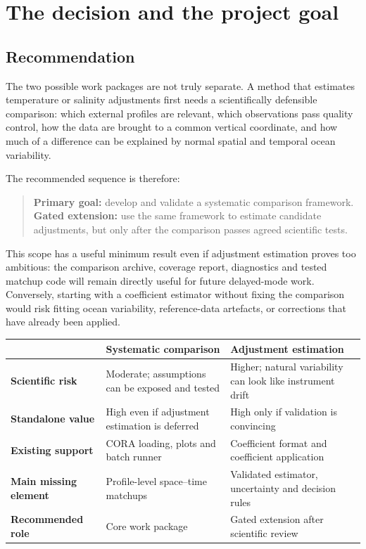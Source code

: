 \documentclass[11pt,a4paper]{article}
\begin{document}
\section{The decision and the project goal}

\subsection{Recommendation}

The two possible work packages are not truly separate. A method that estimates
temperature or salinity adjustments first needs a scientifically defensible comparison:
which external profiles are relevant, which observations pass quality control, how the
data are brought to a common vertical coordinate, and how much of a difference can be
explained by normal spatial and temporal ocean variability.

The recommended sequence is therefore:

\begin{quote}
\textbf{Primary goal:} develop and validate a systematic comparison framework.\\
\textbf{Gated extension:} use the same framework to estimate candidate adjustments,
but only after the comparison passes agreed scientific tests.
\end{quote}

This scope has a useful minimum result even if adjustment estimation proves too
ambitious: the comparison archive, coverage report, diagnostics and tested matchup code
will remain directly useful for future delayed-mode work. Conversely, starting with a
coefficient estimator without fixing the comparison would risk fitting ocean variability,
reference-data artefacts, or corrections that have already been applied.

\begin{center}
\begin{tabularx}{0.96\textwidth}{>{\bfseries}p{}XX}
\toprule
 & Systematic comparison & Adjustment estimation \\
\midrule
Scientific risk & Moderate; assumptions can be exposed and tested & Higher; natural variability can look like instrument drift \\
Standalone value & High even if adjustment estimation is deferred & High only if validation is convincing \\
Existing support & CORA loading, plots and batch runner & Coefficient format and coefficient application \\
Main missing element & Profile-level space--time matchups & Validated estimator, uncertainty and decision rules \\
Recommended role & Core work package & Gated extension after scientific review \\
\bottomrule
\end{tabularx}
\end{center}
\end{document}
